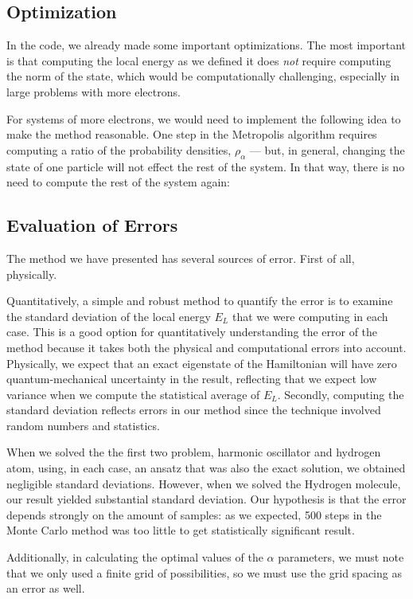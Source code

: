 \documentclass[12pt]{article}
\numberwithin{equation}{section}
\begin{document}
\subsection{Optimization}
In the code, we already made some important optimizations.  The most important is that computing the local energy as we defined it does \textit{not} require computing the norm of the state, which would be computationally challenging, especially in large problems with more electrons.

For systems of more electrons, we would need to implement the following idea to make the method reasonable.  One step in the Metropolis algorithm requires computing a ratio of the probability densities, $\rho_\alpha$ --- but, in general, changing the state of one particle will not effect the rest of the system.  In that way, there is no need to compute the rest of the system again:

\subsection{Evaluation of Errors}
The method we have presented has several sources of error.  First of all, physically.

Quantitatively, a simple and robust method to quantify the error is to examine the standard deviation of the local energy $E_L$ that we were computing in each case.  This is a good option for quantitatively understanding the error of the method because it takes both the physical and computational errors into account.  Physically, we expect that an exact eigenstate of the Hamiltonian will have zero quantum-mechanical uncertainty in the result, reflecting that we expect low variance when we compute the statistical average of $E_L$.  Secondly, computing the standard deviation reflects errors in our method since the technique involved random numbers and statistics.

When we solved the the first two problem, harmonic oscillator and hydrogen atom, using, in each case, an ansatz that was also the exact solution, we obtained negligible standard deviations.  However, when we solved the Hydrogen molecule, our result yielded substantial standard deviation.  Our hypothesis is that the error depends strongly on the amount of samples: as we expected, 500 steps in the Monte Carlo method was too little to get statistically significant result.

Additionally, in calculating the optimal values of the $\alpha$ parameters, we must note that we only used a finite grid of possibilities, so we must use the grid spacing as an error as well.
\end{document}
